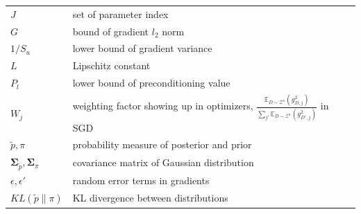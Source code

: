 \documentclass{article}
\theoremstyle{plain}
\theoremstyle{definition}
\theoremstyle{remark}
\begin{document}
\begin{table}[ht]
\begin{center}
\begin{small}
\begin{tabular}{ll}
$J$ & set of parameter index \\
$G$ & bound of gradient $l_2$ norm\\
$1/S_u$ & lower bound of gradient variance \\
$L$ & Lipschitz constant \\
$P_l$ & lower bound of preconditioning value \\
$W_j$ & weighting factor showing up in optimizers, $\frac{\mathbb{E}_{D \sim \mathcal{Z}^n}(g_{D,j}^2)}{\sum_{j'} \mathbb{E}_{D \sim \mathcal{Z}^n}(g_{D',j}^2)} $ in SGD \\
$\tilde{p}, \pi$ & probability measure of posterior and prior\\
$\mathbf{\Sigma}_{\tilde{p}}, \mathbf{\Sigma}_{\pi}$ & covariance matrix of Gaussian distribution \\
$\epsilon, \epsilon'$ & random error terms in gradients \\
$KL(\tilde{p}\|\pi)$ & KL divergence between distributions \\
\bottomrule
\end{tabular}
\end{small}
\end{center}
\vskip -0.1in
\end{table}
\end{document}
